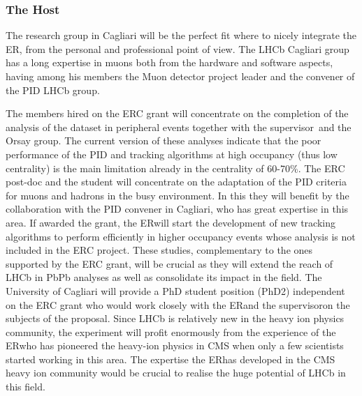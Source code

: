 \documentclass[a4paper,11pt]{article}
\newcommand{\ER}{ER}
\newcommand{\supervisor}{the supervisor}
\begin{document}
\subsubsection{The Host}


The research group in Cagliari
will be the perfect fit where to nicely integrate the \ER, from the
personal and professional point of view. 
The LHCb Cagliari group has a long expertise in 
muons both from the hardware and software 
aspects, having among his members the Muon 
detector project leader and the convener of the 
PID LHCb group.

The members hired on the 
ERC grant will 
concentrate on the completion of the \JPsi analysis of the 
\PbPb dataset in peripheral events together with \supervisor\ and the 
Orsay group. The current 
version of these analyses indicate that the 
poor performance of the PID and tracking algorithms at high occupancy 
(thus low centrality) is the main limitation already 
in the centrality of 60-70\%. The ERC post-doc and the student will 
concentrate on the adaptation of the PID criteria
for muons and hadrons in the busy \PbPb environment.
In this they will benefit by the collaboration 
with the PID convener in 
Cagliari, who has great expertise in this area.
If awarded the grant, the \ER will start the development of 
new tracking algorithms to perform efficiently in higher 
occupancy events whose analysis is not included in the ERC project.
These studies, complementary to the ones supported by the 
ERC grant, will be crucial as they will extend the 
reach of LHCb in PbPb analyses as well as consolidate 
its impact in the field.
The University of Cagliari will provide a PhD student position (PhD2) 
independent on the ERC grant who would work closely with the 
\ER and \supervisor on the subjects of the proposal.
Since LHCb is relatively new in the 
heavy ion physics community, the experiment
will profit enormously from the experience 
of the \ER who has pioneered the heavy-ion physics 
in CMS when only a few scientists started working 
in this area. 
The expertise the \ER has developed in the CMS 
heavy ion community would be crucial to 
realise the huge potential of LHCb in this field.
\end{document}

